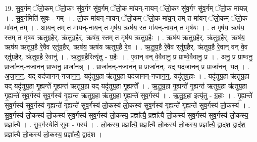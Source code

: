 \documentclass[17pt]{extarticle}
\begin{document}
19. सु॒व॒र्गम् ॅलो॒कम् ॅलो॒कꣳ सु॑व॒र्गꣳ सु॑व॒र्गम् ॅलो॒क मा॑यन्-नायन् ॅलो॒कꣳ सु॑व॒र्गꣳ सु॑व॒र्गम् ॅलो॒क मा॑यन्न् । . सु॒व॒र्गमिति॑ सुवः - गम् । . लो॒क मा॑यन्-नायन् ॅलो॒कम् ॅलो॒क मा॑य॒न् तम् त मा॑यन् ॅलो॒कम् ॅलो॒क मा॑य॒न् तम् । . आ॒य॒न् तम् त मा॑यन्-नाय॒न् त मृष॑य॒ ऋष॑य॒ स्त मा॑यन्-नाय॒न् त मृष॑यः । . त मृष॑य॒ ऋष॑य॒ स्तम् त मृष॑य ऋतुग्र॒हैर्. ऋ॑तुग्र॒हैर्. ऋष॑य॒ स्तम् त मृष॑य ऋतुग्र॒हैः । . ऋष॑य ऋतुग्र॒हैर्. ऋ॑तुग्र॒हैर्. ऋष॑य॒ ऋष॑य ऋतुग्र॒है रे॒वैव र्‌तु॑ग्र॒हैर्. ऋष॑य॒ ऋष॑य ऋतुग्र॒है रे॒व । . ऋ॒तु॒ग्र॒है रे॒वैव र्‌तु॑ग्र॒हैर्. ऋ॑तुग्र॒है रे॒वान् वन् वे॒व र्‌तु॑ग्र॒हैर्. ऋ॑तुग्र॒है रे॒वानु॑ । . ऋ॒तु॒ग्र॒हैरित्यृ॑तु - ग्र॒हैः । . ए॒वान् वन् वे॒वैवानु॒ प्र प्राण्वे॒वैवानु॒ प्र । . अनु॒ प्र प्राण्वनु॒ प्राजा॑नन्-नजान॒न् प्राण्वनु॒ प्राजा॑नन्न् । . प्राजा॑नन्-नजान॒न् प्र प्राजा॑न॒न्॒. यद् यद॑जान॒न् प्र प्राजा॑न॒न्॒. यत् । . अ॒जा॒न॒न्॒. यद् यद॑जानन्-नजान॒न्॒. यदृ॑तुग्र॒हा ऋ॑तुग्र॒हा यद॑जानन्-नजान॒न्॒. यदृ॑तुग्र॒हाः । . यदृ॑तुग्र॒हा ऋ॑तुग्र॒हा यद् यदृ॑तुग्र॒हा गृ॒ह्यन्ते॑ गृ॒ह्यन्त॑ ऋतुग्र॒हा यद् यदृ॑तुग्र॒हा गृ॒ह्यन्ते᳚ । . ऋ॒तु॒ग्र॒हा गृ॒ह्यन्ते॑ गृ॒ह्यन्त॑ ऋतुग्र॒हा ऋ॑तुग्र॒हा गृ॒ह्यन्ते॑ सुव॒र्गस्य॑ सुव॒र्गस्य॑ गृ॒ह्यन्त॑ ऋतुग्र॒हा ऋ॑तुग्र॒हा गृ॒ह्यन्ते॑ सुव॒र्गस्य॑ । . ऋ॒तु॒ग्र॒हा इत्यृ॑तु - ग्र॒हाः । . गृ॒ह्यन्ते॑ सुव॒र्गस्य॑ सुव॒र्गस्य॑ गृ॒ह्यन्ते॑ गृ॒ह्यन्ते॑ सुव॒र्गस्य॑ लो॒कस्य॑ लो॒कस्य॑ सुव॒र्गस्य॑ गृ॒ह्यन्ते॑ गृ॒ह्यन्ते॑ सुव॒र्गस्य॑ लो॒कस्य॑ । . सु॒व॒र्गस्य॑ लो॒कस्य॑ लो॒कस्य॑ सुव॒र्गस्य॑ सुव॒र्गस्य॑ लो॒कस्य॒ प्रज्ञा᳚त्यै॒ प्रज्ञा᳚त्यै लो॒कस्य॑ सुव॒र्गस्य॑ सुव॒र्गस्य॑ लो॒कस्य॒ प्रज्ञा᳚त्यै । . सु॒व॒र्गस्येति॑ सुवः - गस्य॑ । . लो॒कस्य॒ प्रज्ञा᳚त्यै॒ प्रज्ञा᳚त्यै लो॒कस्य॑ लो॒कस्य॒ प्रज्ञा᳚त्यै॒ द्वाद॑श॒ द्वाद॑श॒ प्रज्ञा᳚त्यै लो॒कस्य॑ लो॒कस्य॒ प्रज्ञा᳚त्यै॒ द्वाद॑श । \newline
\end{document}
